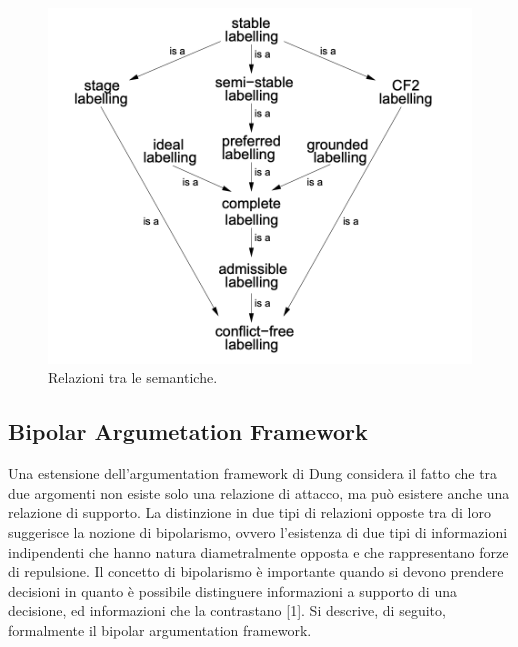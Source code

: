 \begin{figure}
    \includegraphics[width=\linewidth]{Immagini/semantics-relationships.png}
    \caption{Relazioni tra le semantiche.}
    \label{fig:baf-graph1}
\end{figure}


\subsection{Bipolar Argumetation Framework}
Una estensione dell'argumentation framework di Dung considera il fatto che tra due argomenti non esiste solo una relazione di attacco, ma può esistere anche una relazione di supporto. La distinzione in due tipi di relazioni opposte tra di loro suggerisce la nozione di bipolarismo, ovvero l’esistenza di due tipi di informazioni indipendenti che hanno natura diametralmente opposta e che rappresentano forze di repulsione. Il concetto di bipolarismo è importante quando si devono prendere decisioni in quanto è possibile distinguere informazioni a supporto di una decisione, ed informazioni che la contrastano [1]. Si descrive, di seguito, formalmente il bipolar argumentation framework.

